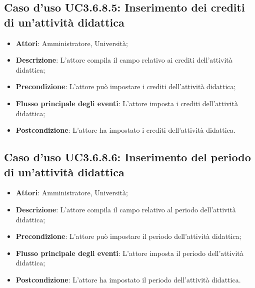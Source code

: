 \subsection{Caso d'uso \texorpdfstring{UC3.6.8.5}{UC3.6.8.5}: Inserimento dei crediti di un’attività didattica}
\begin{itemize}
\item \textbf{Attori}: Amministratore, Università;
\item \textbf{Descrizione}: L'attore compila il campo relativo ai crediti dell'attività didattica;

\item \textbf{Precondizione}: L'attore può impostare i crediti dell'attività didattica;

\item \textbf{Flusso principale degli eventi}: L'attore imposta i crediti dell'attività didattica;

\item \textbf{Postcondizione}: L'attore ha impostato i crediti dell'attività didattica.

\end{itemize}
\subsection{Caso d'uso \texorpdfstring{UC3.6.8.6}{UC3.6.8.6}: Inserimento del periodo di un’attività didattica}
\begin{itemize}
\item \textbf{Attori}: Amministratore, Università;
\item \textbf{Descrizione}: L'attore compila il campo relativo al periodo dell'attività didattica;

\item \textbf{Precondizione}: L'attore può impostare il periodo dell'attività didattica;

\item \textbf{Flusso principale degli eventi}: L'attore imposta il periodo dell'attività didattica;

\item \textbf{Postcondizione}: L'attore ha impostato il periodo dell'attività didattica.

\end{itemize}
